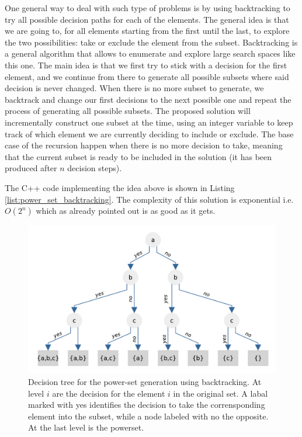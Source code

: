 One general way to deal with such type of problems is by using backtracking to try all possible
decision paths for each of the elements. The general idea is that we are going to, for all elements
starting from the first until the last, to explore the two possibilities: take or exclude the
element from the subset. Backtracking is a general algorithm that allows to enumerate and explore
large search spaces like this one. The main idea is that we first try to stick with a decision for
the first element, and we continue from there to generate all possible subsets where said decision
is never changed. When there is no more subset to generate, we backtrack and change our first
decisions to the next possible one and repeat the process of generating all possible subsets.
The proposed solution will incrementally construct one subset at the time, using an integer variable
to keep track of which element we are currently
deciding to include or exclude. The base case of the recursion happen when there is no more decision
to take, meaning that the current subset is ready to be included in the solution (it has been
produced after $n$ decision steps).

The C++ code implementing the idea above is shown in Listing \ref{list:power_set_backtracking}. The
complexity of this solution is exponential i.e. $O(2^n)$ which as already pointed out is as good as
it gets.


	


\begin{figure}
	\centering
	\includegraphics[width=\textwidth]{sources/power_set/images/tree}
	\caption[Decision tree for the power-set generation using backtracking.]{Decision tree for the power-set generation using backtracking. At level $i$ are the decision for the element $i$ in the original set. A labal marked with yes identifies the decision to take the corrensponding element into the subset, while a node labeled with no the opposite. At the last level is the powerset.}
	\label{ref:power_set_decision_trees}
\end{figure}

